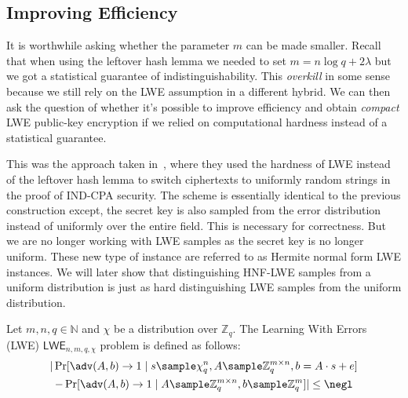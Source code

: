 \documentclass[12pt]{tufte-book}
\newcommand{\LWE}{\mathsf{LWE}} \usepackage{booktabs}
\begin{document}
\subsection{Improving Efficiency}
It is worthwhile asking whether the parameter $m$ can be made smaller. Recall that when using the leftover hash lemma we needed to set $m = n\log{q} + 2\lambda$ but we got a statistical guarantee of indistinguishability. This \emph{overkill} in some sense because we still rely on the LWE assumption in a different hybrid. We can then ask the question of whether it's possible to improve efficiency and obtain \emph{compact} LWE public-key encryption if we relied on computational hardness instead of a statistical guarantee.

This was the approach taken in~\cite{RSA:LinPei11}, where they used the hardness of LWE instead of the leftover hash lemma to switch ciphertexts to uniformly random strings in the proof of IND-CPA security. The scheme is essentially identical to the previous construction except, the secret key is also sampled from the error distribution instead of uniformly over the entire field. This is necessary for correctness. But we are no longer working with LWE samples as the secret key is no longer uniform. These new type of instance are referred to as Hermite normal form LWE instances. We will later show that distinguishing HNF-LWE samples from a uniform distribution is just as hard distinguishing LWE samples from the uniform distribution.

\begin{definition}
    Let $m,n,q \in \mathbb{N}$ and $\chi$ be a distribution over $\mathbb{Z}_q$. The Learning With Errors (LWE) $\LWE_{n,m,q,\chi}$ problem is defined as follows:
    \begin{multline*}
        |\Pr[\adv(A,b) \to 1 \mid s \sample \chi_q^n, A \sample \mathbb{Z}_q^{m \times n}, b = A \cdot s + e ] \\
        - \Pr[\adv(A,b) \to 1 \mid A \sample \mathbb{Z}_q^{m \times n}, b \sample \mathbb{Z}_q^m ]|\leq \negl
    \end{multline*}
\end{definition}
\end{document}
